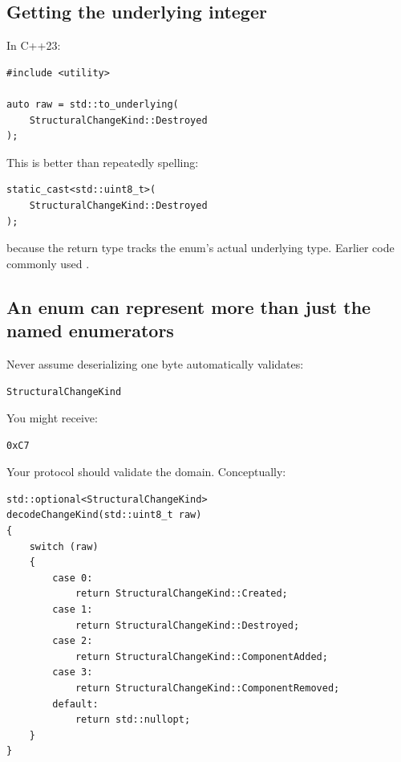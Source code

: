 \subsection{Getting the underlying integer}\label{05-engine-i-ch003-getting-the-underlying-integer}

\hypertarget{05-engine-i-ch003-getting-the-underlying-integer}{}

In C++23:

\begin{verbatim}
#include <utility>

auto raw = std::to_underlying(
    StructuralChangeKind::Destroyed
);
\end{verbatim}

This is better than repeatedly spelling:

\begin{verbatim}
static_cast<std::uint8_t>(
    StructuralChangeKind::Destroyed
);
\end{verbatim}

because the return type tracks the enum's actual underlying type. Earlier code commonly used .

\subsection{An enum can represent more than just the named enumerators}\label{05-engine-i-ch003-an-enum-can-represent-more-than-just-the-named-enumerators}

\hypertarget{05-engine-i-ch003-an-enum-can-represent-more-than-just-the-named-enumerators}{}

Never assume deserializing one byte automatically validates:

\begin{verbatim}
StructuralChangeKind
\end{verbatim}

You might receive:

\begin{verbatim}
0xC7
\end{verbatim}

Your protocol should validate the domain. Conceptually:

\begin{verbatim}
std::optional<StructuralChangeKind>
decodeChangeKind(std::uint8_t raw)
{
    switch (raw)
    {
        case 0:
            return StructuralChangeKind::Created;
        case 1:
            return StructuralChangeKind::Destroyed;
        case 2:
            return StructuralChangeKind::ComponentAdded;
        case 3:
            return StructuralChangeKind::ComponentRemoved;
        default:
            return std::nullopt;
    }
}
\end{verbatim}

